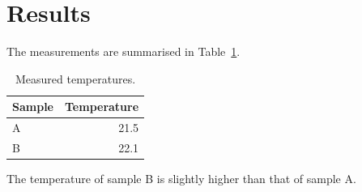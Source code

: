 \section{Results}
\label{sec:results}

The measurements are summarised in Table~\ref{tab:measurements}.

\begin{table}
\centering
\begin{tabular}{l|r}
Sample & Temperature \\\hline
A & 21.5 \\
B & 22.1
\end{tabular}
\caption{\label{tab:measurements}Measured temperatures.}
\end{table}

The temperature of sample B is slightly higher than that of sample A.
